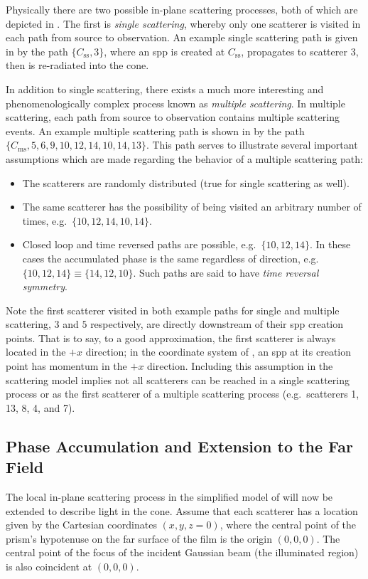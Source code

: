 Physically there are two possible in-plane scattering processes, both of which
are depicted in .  The first is \textit{single
scattering}, whereby only one scatterer is visited in each path from source to
observation.  An example single scattering path is given in
 by the path $\{C_\mathrm{ss},3\}$, where an \gls{spp}
is created at $C_\mathrm{ss}$, propagates to scatterer $3$, then is
re-radiated into the cone.

In addition to single scattering, there exists a much more interesting and
phenomenologically complex process known as \textit{multiple scattering}.  In
multiple scattering, each path from source to observation contains multiple
scattering events.  An example multiple scattering path is shown
in  by the path
$\{C_\mathrm{ms},5,6,9,10,12,14,10,14,13\}$.  This path serves to illustrate
several important assumptions which are made regarding the behavior of a multiple scattering
path:
\begin{itemize}
\item The scatterers are randomly distributed (true for single scattering as well).
\item The same scatterer has the possibility of being visited an arbitrary number of times, e.g.\ $\{10,12,14,10,14\}$.
\item Closed loop and time reversed paths are possible, e.g.\ $\{10,12,14\}$.  In these cases the accumulated phase is the same regardless of direction, e.g.\ $\{10,12,14\} \equiv \{14,12,10\}$.  Such paths are said to have \textit{time reversal symmetry}.
\end{itemize}

Note the first scatterer visited in both example paths for single and multiple
scattering, $3$ and $5$ respectively, are directly downstream of their \gls{spp}
creation points.  That is to say, to a good approximation, the first scatterer
is always located in the ${+}x$ direction; in the coordinate system of
, an \gls{spp} at its creation point has momentum in
the ${+}x$ direction.  Including this assumption in the scattering model
implies not all scatterers can be reached in a single scattering process or as
the first scatterer of a multiple scattering process (e.g.\ scatterers
1, 13, 8, 4, and 7).

\subsection{Phase Accumulation and Extension to the Far Field}
The local in-plane scattering process in the simplified model of
 will now be extended to describe light in the
cone.  Assume that each scatterer has a location given
by the Cartesian coordinates $(x,y,z=0)$, where the central point of the
prism's hypotenuse on the far surface of the film is the origin
$(0,0,0)$.  The central point of the focus of the incident Gaussian
beam (the illuminated region) is also coincident at $(0,0,0)$.

